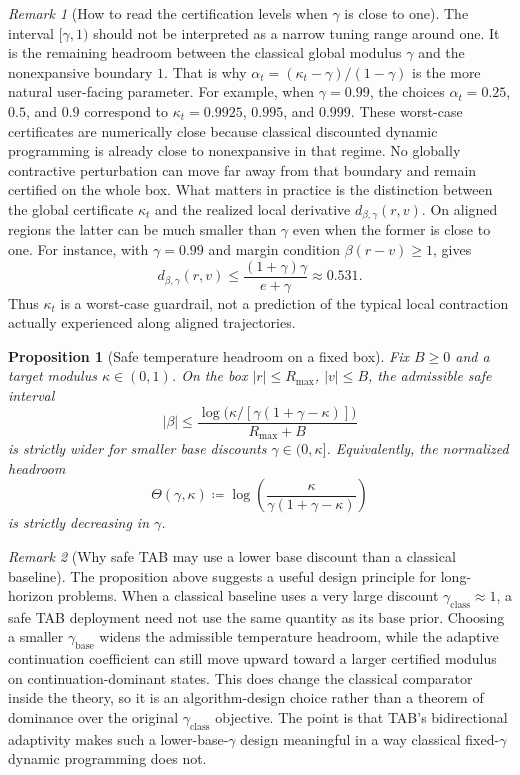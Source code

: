 \documentclass{article}
\newtheorem{proposition}[proposition]{Proposition}
\theoremstyle{remark}
\newtheorem{remark}[remark]{Remark}
\newcommand{\defeq}{\coloneqq}
\begin{document}
\begin{remark}[How to read the certification levels when $\gamma$ is close to one]
\label{rem:kappa-headroom}
The interval $[\gamma,1)$ should not be interpreted as a narrow tuning range around one.
It is the remaining headroom between the classical global modulus $\gamma$ and the nonexpansive boundary $1$.
That is why $\alpha_t=(\kappa_t-\gamma)/(1-\gamma)$ is the more natural user-facing parameter.
For example, when $\gamma=0.99$, the choices $\alpha_t=0.25$, $0.5$, and $0.9$ correspond to $\kappa_t=0.9925$, $0.995$, and $0.999$.
These worst-case certificates are numerically close because classical discounted dynamic programming is already close to nonexpansive in that regime.
No globally contractive perturbation can move far away from that boundary and remain certified on the whole box.
What matters in practice is the distinction between the global certificate $\kappa_t$ and the realized local derivative $d_{\beta,\gamma}(r,v)$.
On aligned regions the latter can be much smaller than $\gamma$ even when the former is close to one.
For instance, with $\gamma=0.99$ and margin condition $\beta(r-v)\ge 1$,  gives
\[
 d_{\beta,\gamma}(r,v)\le \frac{(1+\gamma)\gamma}{e+\gamma}\approx 0.531.
\]
Thus $\kappa_t$ is a worst-case guardrail, not a prediction of the typical local contraction actually experienced along aligned trajectories.
\end{remark}

\begin{proposition}[Safe temperature headroom on a fixed box]
\label{prop:gamma-headroom}
Fix $B\ge 0$ and a target modulus $\kappa\in(0,1)$. On the box $|r|\le R_{\max}$, $|v|\le B$, the admissible safe interval
\[
|\beta|
\le
\frac{\log\!\bigl(\kappa/[\gamma(1+\gamma-\kappa)]\bigr)}{R_{\max}+B}
\]
is strictly wider for smaller base discounts $\gamma\in(0,\kappa]$. Equivalently, the normalized headroom
\[
\Theta(\gamma,\kappa)\defeq \log\!\left(\frac{\kappa}{\gamma(1+\gamma-\kappa)}\right)
\]
is strictly decreasing in $\gamma$.
\end{proposition}

\begin{remark}[Why safe TAB may use a lower base discount than a classical baseline]
\label{rem:lower-base-gamma}
The proposition above suggests a useful design principle for long-horizon problems. When a classical baseline uses a very large discount $\gamma_{\mathrm{class}}\approx 1$, a safe TAB deployment need not use the same quantity as its base prior. Choosing a smaller $\gamma_{\mathrm{base}}$ widens the admissible temperature headroom, while the adaptive continuation coefficient can still move upward toward a larger certified modulus on continuation-dominant states. This does change the classical comparator inside the theory, so it is an algorithm-design choice rather than a theorem of dominance over the original $\gamma_{\mathrm{class}}$ objective. The point is that TAB's bidirectional adaptivity makes such a lower-base-$\gamma$ design meaningful in a way classical fixed-$\gamma$ dynamic programming does not.
\end{remark}
\end{document}
